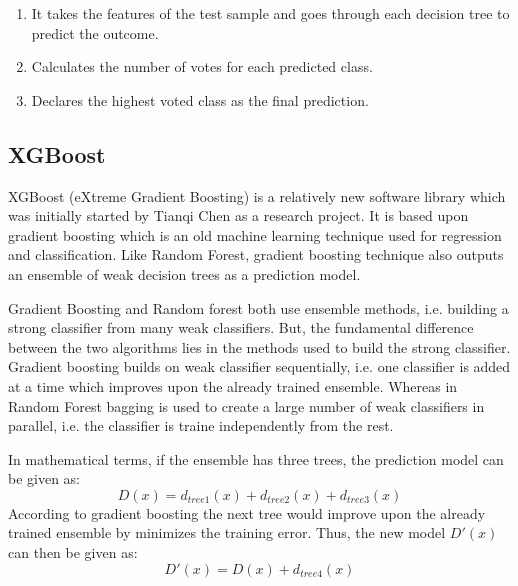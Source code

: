 \begin{enumerate}
	\item It takes the features of the test sample and goes through each decision tree to predict the outcome.
	\item Calculates the number of votes for each predicted class.
	\item Declares the highest voted class as the final prediction.
\end{enumerate}

\subsection{XGBoost}

XGBoost (eXtreme Gradient Boosting) is a relatively new software library which was initially started by Tianqi Chen \cite{ChenG16, XGBWiki} as a research project. It is based upon gradient boosting which is an old machine learning technique used for regression and classification. Like Random Forest, gradient boosting technique also outputs an ensemble of weak decision trees as a prediction model. 

Gradient Boosting and Random forest both use ensemble methods, i.e. building a strong classifier from many weak classifiers. But, the fundamental difference between the two algorithms lies in the methods used to build the strong classifier. Gradient boosting builds on weak classifier sequentially, i.e. one classifier is added at a time which improves upon the already trained ensemble. Whereas in Random Forest bagging is used to create a large number of weak classifiers in parallel, i.e. the classifier is traine independently from the rest.

In mathematical terms, if the ensemble has three trees, the prediction model can be given as:
$$
	D(x) = d_{tree 1}(x) + d_{tree 2}(x) + d_{tree 3}(x)
$$
According to gradient boosting the next tree would improve upon the already trained ensemble by minimizes the training error. Thus, the new model $D'(x)$ can then be given as:
$$
D'(x) = D(x) + d_{tree 4}(x)
$$
